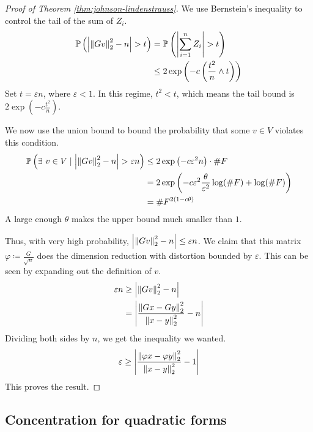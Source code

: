 \documentclass[11pt]{article}
\begin{document}
\begin{proof}[Proof of Theorem \ref{thm:johnson-lindenstrauss}]
  We use Bernstein's inequality to control the tail of the sum of $Z_i$.
  \begin{align*}
    \mathbb{P}\left( \left| \left\lVert Gv\right\rVert_2^2 - n \right| > t \right)
    &= \mathbb{P}\left( \left| \sum_{i=1}^n Z_i \right| > t \right) \\
    &\leq 2\exp\left( -c \left( \frac{t^2}{n} \wedge t \right) \right)
  \end{align*}
  Set $t = \varepsilon n$, where $\varepsilon < 1$. In this regime, $t^2 < t$, which means the tail bound is $2 \exp\left( -c\frac{t^2}{n} \right)$.

  We now use the union bound to bound the probability that some $v \in V$ violates this condition.
  \begin{align*}
    \mathbb{P}\left( \exists\ v \in V \mid \left| \left\lVert Gv\right\rVert_2^2 - n \right| > \varepsilon n \right)
    &\leq 2 \exp\left( -c \varepsilon^2 n \right) \cdot \#F \\
    &= 2 \exp\left( -c \varepsilon^2 \frac{\theta}{\varepsilon^2} \log(\#F) + \log(\#F) \right) \\
    &= \#F^{2(1 - c\theta)}
  \end{align*}
  A large enough $\theta$ makes the upper bound much smaller than $1$.

  Thus, with very high probability, $\left| \left\lVert Gv\right\rVert_2^2 - n \right| \leq \varepsilon n$.
  We claim that this matrix $\varphi \coloneqq \frac{G}{\sqrt{n}}$ does the dimension reduction with distortion bounded by $\varepsilon$.
  This can be seen by expanding out the definition of $v$.
  \begin{align*}
    \varepsilon n
    &\geq \left| \left\lVert Gv\right\rVert_2^2 - n \right| \\
    &= \left| \frac{\left\lVert Gx - Gy\right\rVert_2^2}{\left\lVert x-y\right\rVert_2^2} - n \right|
  \end{align*}
  Dividing both sides by $n$, we get the inequality we wanted.
  \begin{align*}
    \varepsilon \geq \left| \frac{\left\lVert\varphi x - \varphi y\right\rVert_2^2}{\left\lVert x-y\right\rVert_2^2} - 1 \right|
  \end{align*}
  This proves the result.
\end{proof}

\subsection{Concentration for quadratic forms}
\label{sec:conc-quadr-forms}
\end{document}
